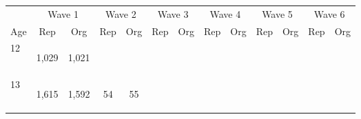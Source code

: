 \begin{center}
\begin{tabular}{lcccccccccccc}
\hline \noalign{\smallskip} & \multicolumn{2}{c}{Wave 1} & \multicolumn{2}{c}{Wave 2} & \multicolumn{2}{c}{Wave 3} & \multicolumn{2}{c}{Wave 4} & \multicolumn{2}{c}{Wave 5} & \multicolumn{2}{c}{Wave 6}\\
Age & Rep & Org & Rep & Org & Rep & Org & Rep & Org & Rep & Org & Rep & Org\\
\noalign{\smallskip}\hline \noalign{\smallskip}12 & \begin{bf}1,029\end{bf} & \begin{rm}1,021\end{rm} & \begin{bf}\end{bf} & \begin{rm}\end{rm} & \begin{bf}\end{bf} & \begin{rm}\end{rm} & \begin{bf}\end{bf} & \begin{rm}\end{rm} & \begin{bf}\end{bf} & \begin{rm}\end{rm} & \begin{bf}\end{bf} & \begin{rm}\end{rm}\\
13 & \begin{bf}1,615\end{bf} & \begin{rm}1,592\end{rm} & \begin{bf}54\end{bf} & \begin{rm}55\end{rm} & \begin{bf}\end{bf} & \begin{rm}\end{rm} & \begin{bf}\end{bf} & \begin{rm}\end{rm} & \begin{bf}\end{bf} & \begin{rm}\end{rm} & \begin{bf}\end{bf} & \begin{rm}\end{rm}\\

\end{tabular}
\end{center}
